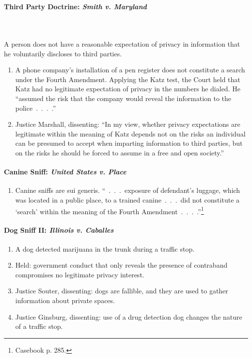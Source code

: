 \paragraph{Third Party Doctrine: \emph{Smith v. Maryland}}
~\\\\
A person does not have a reasonable expectation of privacy in information that 
he voluntarily discloses to third parties.

\begin{enumerate}
    \item A phone company's installation of a pen register does not constitute 
    a search under the Fourth Amendment. Applying the Katz test, the Court 
    held that Katz had no legitimate expectation of privacy in the numbers he 
    dialed. He ``assumed the risk that the company would reveal the 
    information to the police~.~.~.~.''
    \item Justice Marshall, dissenting: ``In my view, whether privacy 
    expectations are legitimate within the meaning of Katz depends not on the 
    risks an individual can be presumed to accept when imparting information 
    to third parties, but on the risks he should be forced to assume in a free 
    and open society.''
\end{enumerate}

\paragraph{Canine Sniff: \emph{United States v. Place}}

\begin{enumerate}
    \item Canine sniffs are sui generis. ``~.~.~.~exposure of defendant's 
    luggage, which was located in a public place, to a trained 
    canine~.~.~.~did not constitute a `search' within the meaning of the 
    Fourth Amendment~.~.~.~.''\footnote{Casebook p. 285.}
\end{enumerate}

\paragraph{Dog Sniff II: \emph{Illinois v. Caballes}}
\label{par:caballes}

\begin{enumerate}
    \item A dog detected marijuana in the trunk during a traffic stop.
    \item Held: government conduct that only reveals the presence of 
    contraband compromises no legitimate privacy interest.
    \item Justice Souter, dissenting: dogs are fallible, and they are used to 
    gather information about private spaces.
    \item Justice Ginsburg, dissenting: use of a drug detection dog changes 
    the nature of a traffic stop.
\end{enumerate}

